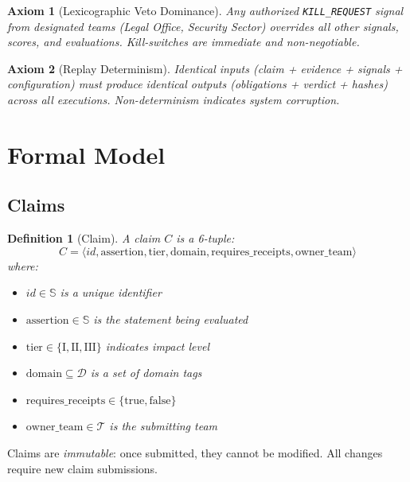 \documentclass[11pt, letterpaper]{article}
\newtheorem{axiom}{Axiom}
\newtheorem{definition}{Definition}
\begin{document}
\begin{axiom}[Lexicographic Veto Dominance]
\label{ax:kill-switch}
Any authorized \texttt{KILL\_REQUEST} signal from designated teams (Legal Office, Security Sector) overrides all other signals, scores, and evaluations. Kill-switches are immediate and non-negotiable.
\end{axiom}

\begin{axiom}[Replay Determinism]
\label{ax:replay}
Identical inputs (claim + evidence + signals + configuration) must produce identical outputs (obligations + verdict + hashes) across all executions. Non-determinism indicates system corruption.
\end{axiom}

\section{Formal Model}

\subsection{Claims}

\begin{definition}[Claim]
A claim $C$ is a 6-tuple:
\[
C = \langle id, \text{assertion}, \text{tier}, \text{domain}, \text{requires\_receipts}, \text{owner\_team} \rangle
\]
where:
\begin{itemize}
    \item $id \in \mathbb{S}$ is a unique identifier
    \item $\text{assertion} \in \mathbb{S}$ is the statement being evaluated
    \item $\text{tier} \in \{\text{I}, \text{II}, \text{III}\}$ indicates impact level
    \item $\text{domain} \subseteq \mathcal{D}$ is a set of domain tags
    \item $\text{requires\_receipts} \in \{\text{true}, \text{false}\}$
    \item $\text{owner\_team} \in \mathcal{T}$ is the submitting team
\end{itemize}
\end{definition}

Claims are \textit{immutable}: once submitted, they cannot be modified. All changes require new claim submissions.
\end{document}
